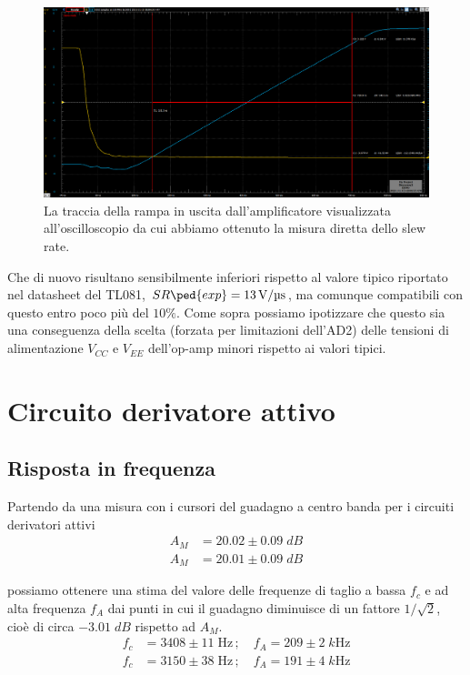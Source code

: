 \documentclass[10pt,a4paper]{article}
\begin{document}
\begin{figure}[htbp]
\centering
\includegraphics[scale=0.37]{slew}
\caption{La traccia della rampa in uscita dall'amplificatore visualizzata
all'oscilloscopio da cui abbiamo ottenuto la misura diretta dello slew rate.
\label{fig: slewrate}}
\end{figure}

Che di nuovo risultano sensibilmente inferiori rispetto al valore tipico
riportato nel datasheet del TL081, $SR\ped{exp} = \SI{13}{\V/\micro\s}$,
ma comunque compatibili con questo entro poco più del $10\%$. Come sopra
possiamo ipotizzare che questo sia una conseguenza della scelta (forzata
per limitazioni dell'AD2) delle tensioni di alimentazione $V_{CC}$ e $V_{EE}$
dell'op-amp minori rispetto ai valori tipici.

\section{Circuito derivatore attivo}
\subsection{Risposta in frequenza}
Partendo da una misura con i cursori del guadagno a centro banda per i
circuiti derivatori attivi
\begin{align*}
A_M &= 20.02 \pm  0.09 \; \si{dB} \\
A_M &= 20.01 \pm  0.09 \; \si{dB}
\end{align*}

possiamo ottenere una stima del valore delle frequenze di taglio a bassa
$f_c$ e ad alta frequenza $f_A$ dai punti in cui il guadagno diminuisce di un
fattore $1/\sqrt{2}$, cioè di circa $-3.01 \; \si{dB}$ rispetto ad $A_M$.
\begin{align*}
f_c &= 3408 \pm 11 \; \si{\Hz} \, ; \quad f_A = 209 \pm 2 \; \si{k\Hz} \\
f_c &= 3150\pm 38\; \si{\Hz} \, ; \quad f_A = 191\pm 4\; \si{k\Hz}
\end{align*}
\end{document}
